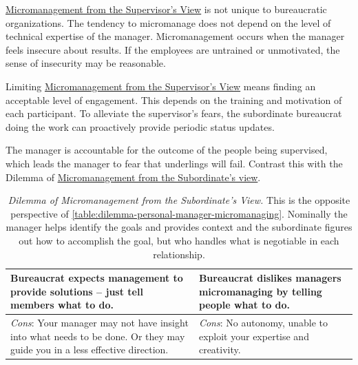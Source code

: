 \hyperref[table:dilemma-personal-manager-micromanaging]{Micromanagement from the Supervisor's View} 
\iftoggle{printedonpaper}{ (\ref{table:dilemma-personal-manager-micromanaging}) }{}%
is not unique to bureaucratic organizations. The tendency to micromanage does not depend on the level of technical expertise of the manager. Micromanagement occurs when the manager feels insecure about results. If the employees are untrained or unmotivated, the sense of insecurity may be reasonable.

Limiting \hyperref[table:dilemma-personal-manager-micromanaging]{Micromanagement from the Supervisor's View}
means finding an acceptable level of engagement. This depends on the training and motivation of each participant. To alleviate the supervisor's fears, the subordinate bureaucrat doing the work can proactively provide periodic status updates. 

The manager is accountable for the outcome of the people being supervised, which leads the manager to fear that underlings will fail.  Contrast this with the Dilemma of  \hyperref[table:dilemma-personal-solution-provider]{Micromanagement from the Subordinate's view}.

\begin{center}
\begin{table}[H] %
\begin{tabular}{ | m{\dilemmatablewidth}| m{\dilemmatablewidth} | } 
  \hline
  \textbf{Bureaucrat expects management to provide solutions -- just tell members what to do.} & 
  \textbf{Bureaucrat dislikes managers micromanaging by telling people what to do.} \\ 
  \hline
  \textit{Cons}: Your manager may not have insight into what needs to be done. Or they may guide you in a less effective direction. &
  \textit{Cons}: No autonomy, unable to exploit your expertise and creativity. \\  
  \hline
\end{tabular}
\caption{\textit{Dilemma of Micromanagement from the Subordinate's View.}
This is the opposite perspective of \ref{table:dilemma-personal-manager-micromanaging}. Nominally the manager helps identify the goals and provides context and the subordinate figures out how to accomplish the goal, but who handles what is negotiable in each relationship.
}
\label{table:dilemma-personal-solution-provider}
\end{table}
\end{center}

